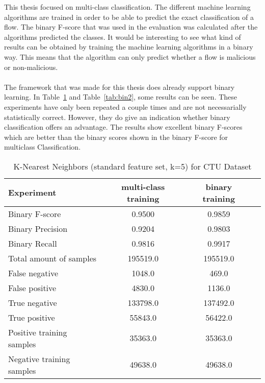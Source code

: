 This thesis focused on multi-class classification. The different machine learning algorithms are trained in order to be able to predict the exact classification of a flow. The binary F-score that was used in the evaluation was calculated after the algorithms predicted the classes. It would be interesting to see what kind of results can be obtained by training the machine learning algorithms in a binary way. This means that the algorithm can only predict whether a flow is malicious or non-malicious. \\
\\
The framework that was made for this thesis does already support binary learning. In Table~\ref{tab:bin} and Table~\ref{tab:bin2}, some results can be seen. These experiments have only been repeated a couple times and are not necessarially statistically correct. However, they do give an indication whether binary classification offers an advantage. The results show excellent binary F-scores which are better than the binary scores shown in the binary F-score for multiclass Classification. 

\begin{table}[H]
\caption{K-Nearest Neighbors (standard feature set, k=5) for CTU Dataset}
\label{tab:bin}
\centering
\begin{tabular}{l c c r}
\toprule
Experiment & multi-class training & binary training \\
\midrule
Binary F-score & 0.9500 & 0.9859  \\
Binary Precision & 0.9204 & 0.9803 \\
Binary Recall & 0.9816 & 0.9917 \\
\midrule
Total amount of samples & 195519.0 & 195519.0 \\
False negative & 1048.0 & 469.0  \\
False positive & 4830.0 & 1136.0  \\
True negative & 133798.0 & 137492.0  \\
True positive & 55843.0 & 56422.0  \\
\midrule
Positive training samples & 35363.0 & 35363.0 \\
Negative training samples & 49638.0 & 49638.0 \\
\bottomrule
\end{tabular}
\end{table}

